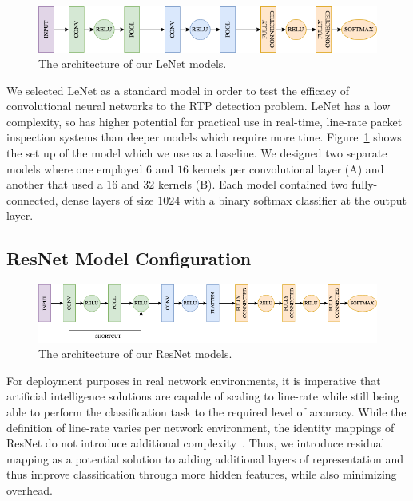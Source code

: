 \begin{figure} [ht!]
\includegraphics[width=\linewidth]{chapters/5/img/lenet.drawio.png}
\caption{The architecture of our LeNet models.}
\label{fig:lenet}
\end{figure}

We selected LeNet as a standard model in order to test the efficacy of convolutional neural networks to the RTP detection problem. LeNet has a low complexity, so has higher potential for practical use in real-time, line-rate packet inspection systems than deeper models which require more time. Figure~\ref{fig:lenet} shows the set up of the model which we use as a baseline. We designed two separate models where one employed $6$ and $16$ kernels per convolutional layer (A) and another that used a $16$ and $32$ kernels (B). Each model contained two fully-connected, dense layers of size $1024$ with a binary softmax classifier at the output layer.

\subsection{ResNet Model Configuration}

\begin{figure} [ht!]
\includegraphics[width=\linewidth]{chapters/5/img/resnet.drawio.png}
\caption{The architecture of our ResNet models.}
\label{fig:resnet}
\end{figure}

For deployment purposes in real network environments, it is imperative that artificial intelligence solutions are capable of scaling to line-rate while still being able to perform the classification task to the required level of accuracy. While the definition of line-rate varies per network environment, the identity mappings of ResNet do not introduce additional complexity~\cite{resnet}. Thus, we introduce residual mapping as a potential solution to adding additional layers of representation and thus improve classification through more hidden features, while also minimizing overhead.

